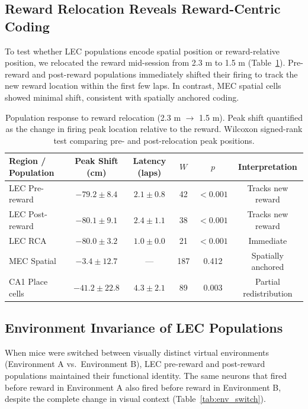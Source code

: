 \documentclass[11pt]{article}
\begin{document}
\subsection{Reward Relocation Reveals Reward-Centric Coding}

To test whether LEC populations encode spatial position or reward-relative position, we relocated the reward mid-session from 2.3 m to 1.5 m (Table~\ref{tab:relocation}). Pre-reward and post-reward populations immediately shifted their firing to track the new reward location within the first few laps. In contrast, MEC spatial cells showed minimal shift, consistent with spatially anchored coding.

\begin{table}[H]
\centering
\caption{Population response to reward relocation (2.3 m $\rightarrow$ 1.5 m). Peak shift quantified as the change in firing peak location relative to the reward. Wilcoxon signed-rank test comparing pre- and post-relocation peak positions.}
\label{tab:relocation}
\begin{tabular}{lccccc}
\toprule
\textbf{Region / Population} & \textbf{Peak Shift (cm)} & \textbf{Latency (laps)} & \textbf{$W$} & \textbf{$p$} & \textbf{Interpretation} \\
\midrule
LEC Pre-reward & $-79.2 \pm 8.4$ & $2.1 \pm 0.8$ & 42 & $< 0.001$ & Tracks new reward \\
LEC Post-reward & $-80.1 \pm 9.1$ & $2.4 \pm 1.1$ & 38 & $< 0.001$ & Tracks new reward \\
LEC RCA & $-80.0 \pm 3.2$ & $1.0 \pm 0.0$ & 21 & $< 0.001$ & Immediate \\
MEC Spatial & $-3.4 \pm 12.7$ & --- & 187 & 0.412 & Spatially anchored \\
CA1 Place cells & $-41.2 \pm 22.8$ & $4.3 \pm 2.1$ & 89 & 0.003 & Partial redistribution \\
\bottomrule
\end{tabular}
\end{table}

\subsection{Environment Invariance of LEC Populations}

When mice were switched between visually distinct virtual environments (Environment A vs.\ Environment B), LEC pre-reward and post-reward populations maintained their functional identity. The same neurons that fired before reward in Environment A also fired before reward in Environment B, despite the complete change in visual context (Table~\ref{tab:env_switch}).
\end{document}

